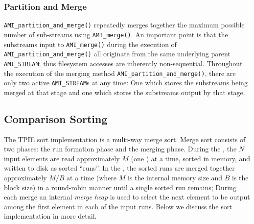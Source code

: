 \subsubsection{Partition and Merge}

\tobeextended

\lstinline|AMI_partition_and_merge()| repeatedly merges together the
maximum possible number of sub-streams using \lstinline|AMI_merge()|.
An important point is that the substreams input to
\lstinline|AMI_merge()| during the execution of
\lstinline|AMI_partition_and_merge()| all originate from the same
underlying parent \lstinline|AMI_STREAM|; thus filesystem accesses are
inherently non-sequential. Throughout the execution of the merging
method \lstinline|AMI_partition_and_merge()|, there are only two
active \lstinline|AMI_STREAM|s at any time: One which stores the
substreams being merged at that stage and one which stores the
substreams output by that stage.


\subsection{Comparison Sorting}

The TPIE sort implementation is a multi-way merge sort.
Merge sort consists of two phases: the run formation phase and the
merging phase. During the , the $N$ input
elements are read approximately $M$ (one ) at a
time, sorted in memory, and written to disk as sorted ``runs''. In the
, the sorted runs are merged together approximately
$M/B$ at a time (where $M$ is the internal memory size and $B$ is the
block size) in a round-robin manner until a single sorted run remains;
During each merge an internal \emph{merge heap} is used to select the
next element to be output among the first element in each of the input
runs. Below we discuss the sort implementation in more detail.



